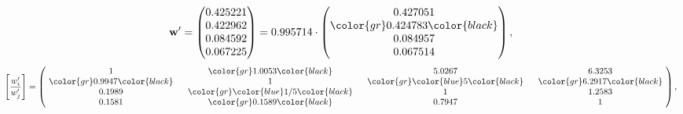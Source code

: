 \begin{example}
\begin{equation*}
\mathbf{w}^{\prime} =
\begin{pmatrix}
0.425221\\
0.422962\\
0.084592\\
0.067225
\end{pmatrix} =
0.995714\cdot
\begin{pmatrix}
0.427051\\
\color{gr} 0.424783\color{black} \\
0.084957\\
0.067514
\end{pmatrix},
\end{equation*}
\begin{equation*}
\left[ \frac{{w}^{\prime}_i}{{w}^{\prime}_j} \right] =
\begin{pmatrix}
$\,\,$ 1 $\,\,$ & $\,\,$\color{gr} 1.0053\color{black} $\,\,$ & $\,\,$5.0267$\,\,$ & $\,\,$6.3253$\,\,$ \\
$\,\,$\color{gr} 0.9947\color{black} $\,\,$ & $\,\,$ 1 $\,\,$ & $\,\,$\color{gr} \color{blue} 5\color{black} $\,\,$ & $\,\,$\color{gr} 6.2917\color{black}   $\,\,$ \\
$\,\,$0.1989$\,\,$ & $\,\,$\color{gr} \color{blue}  1/5\color{black} $\,\,$ & $\,\,$ 1 $\,\,$ & $\,\,$1.2583 $\,\,$ \\
$\,\,$0.1581$\,\,$ & $\,\,$\color{gr} 0.1589\color{black} $\,\,$ & $\,\,$0.7947$\,\,$ & $\,\,$ 1  $\,\,$ \\
\end{pmatrix},
\end{equation*}
\end{example}
\newpage
